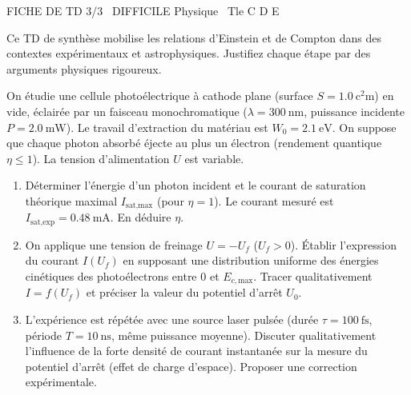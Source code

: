 \documentclass[11pt]{article}
\begin{document}
\begin{tcolorbox}[enhanced,colback=popink,colframe=popink,arc=10pt,boxrule=0pt,left=12pt,right=12pt,top=9pt,bottom=9pt]
{\color{white}\popxbold\small FICHE DE TD 3/3 \textbullet\ DIFFICILE \hfill Physique \textbullet\ Tle C D E\par}
\end{tcolorbox}
\vspace{4pt}
Ce TD de synthèse mobilise les relations d'Einstein et de Compton dans des contextes expérimentaux et astrophysiques. Justifiez chaque étape par des arguments physiques rigoureux.

\begin{exercice}
On étudie une cellule photoélectrique à cathode plane (surface $S = \SI{1,0}{\square\centi\metre}$) en vide, éclairée par un faisceau monochromatique ($\lambda = \SI{300}{\nano\metre}$, puissance incidente $P = \SI{2,0}{\milli\watt}$). Le travail d'extraction du matériau est $W_0 = \SI{2,1}{\electronvolt}$. On suppose que chaque photon absorbé éjecte au plus un électron (rendement quantique $\eta \le 1$). La tension d'alimentation $U$ est variable.
\begin{enumerate}
    \item Déterminer l'énergie d'un photon incident et le courant de saturation théorique maximal $I_{\text{sat,max}}$ (pour $\eta = 1$). Le courant mesuré est $I_{\text{sat,exp}} = \SI{0,48}{\milli\ampere}$. En déduire $\eta$.
    \item On applique une tension de freinage $U = -U_f$ ($U_f > 0$). Établir l'expression du courant $I(U_f)$ en supposant une distribution uniforme des énergies cinétiques des photoélectrons entre $0$ et $E_{c,\text{max}}$. Tracer qualitativement $I = f(U_f)$ et préciser la valeur du potentiel d'arrêt $U_0$.
    \item L'expérience est répétée avec une source laser pulsée (durée $\tau = \SI{100}{\femto\second}$, période $T = \SI{10}{\nano\second}$, même puissance moyenne). Discuter qualitativement l'influence de la forte densité de courant instantanée sur la mesure du potentiel d'arrêt (effet de charge d'espace). Proposer une correction expérimentale.
\end{enumerate}
\end{exercice}
\end{document}
